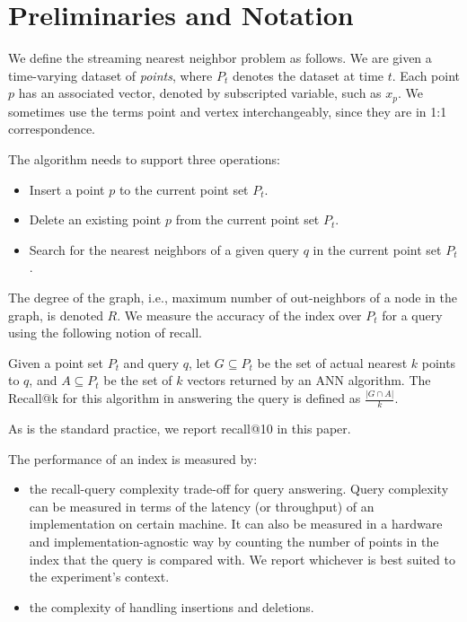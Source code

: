 
\section{Preliminaries and Notation}
\label{sec:prelim}
We define the streaming nearest neighbor problem as follows.
We are given a time-varying dataset of \emph{points}, where $P_t$ denotes the dataset at time $t$.
Each point $p$ has an associated vector, denoted by subscripted variable, such as $x_p$.
We sometimes use the terms point and vertex interchangeably, since they are in 1:1 correspondence.

The algorithm needs to support three operations:
\begin{itemize}
\item Insert a point $p$ to the current point set $P_t$.
\item Delete an existing point $p$ from the current point set $P_t$.
\item Search for the nearest neighbors of a given query $q$ in the current point set $P_t$.
\end{itemize}

The degree of the graph, i.e., maximum number of out-neighbors of a node in the graph, is denoted $R$.
We measure the accuracy of the index over $P_t$ for a query using the following notion of recall.
\begin{definition}[Recall@k]
Given a point set $P_t$ and query $q$, let $G\subseteq P_t$ be the set of actual nearest $k$ points to $q$,
and $A\subseteq P_t$ be the set of $k$ vectors returned by an ANN algorithm.
The Recall@k for this algorithm in answering the query is defined as $\frac{|G\cap A|}{k}$.
\end{definition}
As is the standard practice, we report recall@10 in this paper.

The performance of an index is measured by:
\begin{itemize}
\item the recall-query complexity trade-off for query answering.
Query complexity can be measured in terms of the latency (or throughput)
of an implementation on certain machine. It can also be measured in a hardware
and implementation-agnostic way by counting the number of points in the
index that the query is compared with. We report whichever is best suited
to the experiment's context.
\item the complexity of handling insertions and deletions.
\end{itemize}

